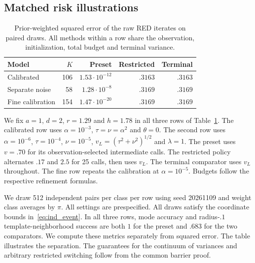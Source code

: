 \subsection{Matched risk illustrations}
\begin{table}[t]
\centering\small
\setlength{\tabcolsep}{3pt}
\begin{tabular}{lrrrr}
\toprule
Model & $K$ & Preset & Restricted & Terminal\\
\midrule
Calibrated & 106 & $1.53\cdot10^{-12}$ & $.3163$ & $.3163$\\
Separate noise & 58 & $1.28\cdot10^{-8}$ & $.3169$ & $.3169$\\
Fine calibration & 154 & $1.47\cdot10^{-20}$ & $.3169$ & $.3169$\\
\bottomrule
\end{tabular}
\caption{Prior-weighted squared error of the raw RED iterates on paired draws.
All methods within a row share the observation, initialization, total
budget and terminal variance.}
\label{tab:risk_diagnostics}
\end{table}
We fix $a=1$, $d=2$, $r=1.29$ and $h=1.78$ in all three rows of
Table~\ref{tab:risk_diagnostics}. The calibrated row uses
$\alpha=10^{-3}$, $\tau=\nu=\alpha^2$ and $\theta=0$.
The second row uses $\alpha=10^{-6}$, $\tau=10^{-4}$,
$\nu=10^{-5}$, $v_L=(\tau^2+\nu^2)^{1/2}$ and $\lambda=1$.
The preset uses $v=.70$ for its observation-selected intermediate calls.
The restricted policy alternates $.17$ and $2.5$ for 25 calls, then
uses $v_L$. The terminal comparator uses $v_L$ throughout.
The fine row repeats the calibration at $\alpha=10^{-5}$.
Budgets follow the respective refinement formulas.

We draw 512 independent pairs per class per row using seed 20261109
and weight class averages by $\pi$. All settings are prespecified.
All draws satisfy the coordinate bounds in~\eqref{eq:ind_event}.
In all three rows, mode accuracy and radius-$.1$ template-neighborhood success
are both $1$ for the preset and $.683$ for the two comparators.
We compute these metrics separately from squared error.
The table illustrates the separation.
The guarantees for the continuum of variances and arbitrary restricted
switching follow from the common barrier proof.


